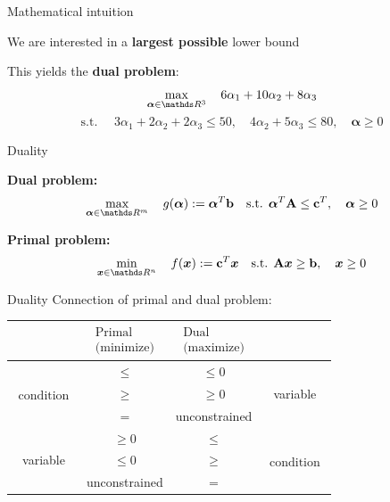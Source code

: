 \documentclass[11pt,compress,t,notes=noshow, xcolor=table]{beamer}
\begin{document}
\begin{framei}{Mathematical intuition}
\item We are interested in a \textbf{largest possible} lower bound
\item This yields the \textbf{dual problem}:
$$
\max_{\bm{\alpha} \in \R^3} \quad 6 \alpha_1 + 10 \alpha_2 + 8 \alpha_3
$$
$$
\text{s.t. } \quad 3\alpha_1 + 2\alpha_2 + 2\alpha_3 \le 50, \quad 4\alpha_2 + 5\alpha_3 \le 80, \quad \bm{\alpha} \ge 0
$$
\end{framei}


\begin{framei}{Duality}
\item[] \textbf{Dual problem:}
$$\max_{\bm{\alpha} \in \R^m} \quad g(\bm{\alpha}) := \bm{\alpha}^T \bv \quad \text{s.t. } \bm{\alpha}^T \Amat \le \mathbf{c}^T, \quad \bm{\alpha} \ge 0$$
\item[] \textbf{Primal problem:}
$$\min_{\xv \in \R^n} \quad \fx := \mathbf{c}^T \xv \quad \text{s.t. } \Amat \xv \ge \bv, \quad \xv \ge 0$$
\end{framei}


\begin{framev}[fs=small]{Duality}
Connection of primal and dual problem:
\vfill
\begin{center}
\begin{tabular}{c||c|c||c}
& $\begin{array}{c} \text{Primal} \\ \text{(minimize)} \end{array}$ & $\begin{array}{c} \text{Dual} \\ \text{(maximize)} \end{array}$ \\
\hline\hline
\multirow{3}{*}{$\begin{array}{c} \text{condition} \end{array}$} & $\le$ & $\le 0$ & \multirow{3}{*}{variable} \\
& $\ge$ & $\ge 0$ & \\
& $=$ & unconstrained & \\
\hline
\multirow{3}{*}{variable} & $\ge 0 $ & $\le$ & \multirow{3}{*}{$\begin{array}{c} \text{condition} \end{array}$}\\
& $\le 0$ &  $\ge$ & \\
& unconstrained & $=$ &
\end{tabular}
\end{center}
\end{framev}
\end{document}
